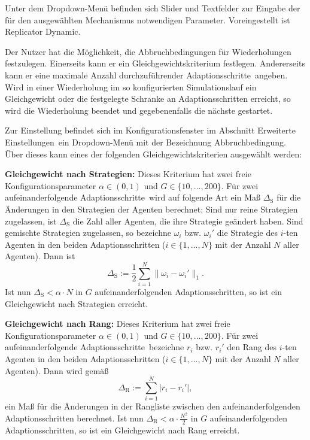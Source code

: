 \documentclass[parskip=full,11pt,twoside]{scrartcl}
\def\adapts{Adaptionsschritte}
\begin{document}
Unter dem Dropdown-Menü befinden sich Slider und Textfelder zur Eingabe der für den ausgewählten Mechanismus notwendigen Parameter. Voreingestellt ist \glqq Replicator Dynamic\grqq.

Der Nutzer hat die Möglichkeit, die Abbruchbedingungen für Wiederholungen festzulegen. Einerseits kann er ein Gleichgewichtskriterium festlegen. Andererseits kann er eine maximale Anzahl durchzuführender \adapts\ angeben. Wird in einer Wiederholung im so konfigurierten Simulationslauf ein Gleichgewicht oder die festgelegte Schranke an \adapts n erreicht, so wird die Wiederholung beendet und gegebenenfalls die nächste gestartet.

Zur Einstellung befindet sich im Konfigurationsfenster im Abschnitt \glqq Erweiterte Einstellungen\grqq\ ein Dropdown-Menü mit der Bezeichnung \glqq Abbruchbedingung\grqq. Über dieses kann eines der folgenden Gleichgewichtskriterien ausgewählt werden:

\textbf{Gleichgewicht nach Strategien:}
Dieses Kriterium hat zwei freie Konfigurationsparameter \(\alpha \in (0,1)\) und \(G \in \{10,...,200\}\). Für zwei aufeinanderfolgende \adapts\ wird auf folgende Art ein Maß \(\Delta_\text{S}\) für die Änderungen in den Strategien der Agenten berechnet: Sind nur reine Strategien zugelassen, ist \(\Delta_\text{S}\)  die Zahl aller Agenten, die ihre Strategie geändert haben. Sind gemischte Strategien zugelassen, so bezeichne \(\omega_i\) bzw. \(\omega_i'\) die Strategie des \(i\)-ten Agenten in den beiden \adapts n (\(i \in \{1,...,N\}\) mit der Anzahl \(N\) aller Agenten). Dann ist
\[
\Delta_\text{S} :=\frac 12 \sum_{i=1}^N \|\omega_i - \omega_i'\|_1.
\]
Ist nun \(\Delta_\text{S} < \alpha \cdot N\) in \(G\) aufeinanderfolgenden \adapts n, so ist ein Gleichgewicht nach Strategien erreicht.

\textbf{Gleichgewicht nach Rang:}
Dieses Kriterium hat zwei freie Konfigurationsparameter \(\alpha \in (0,1)\) und \(G \in \{10,...,200\}\). Für zwei aufeinanderfolgende \adapts\ bezeichne \(r_i\) bzw. \(r_i'\) den Rang des \(i\)-ten Agenten in den beiden \adapts n (\(i \in \{1,...,N\}\) mit der Anzahl \(N\) aller Agenten). Dann wird gemäß
\[
\Delta_\text{R} := \sum_{i=1}^N |r_i - r_i'|,
\]
ein Maß für die Änderungen in der Rangliste zwischen den aufeinanderfolgenden \adapts n berechnet. Ist nun \(\Delta_\text{R} < \alpha \cdot \frac{N^2}{2}\) in \(G\) aufeinanderfolgenden \adapts n, so ist ein Gleichgewicht nach Rang erreicht.
\end{document}
